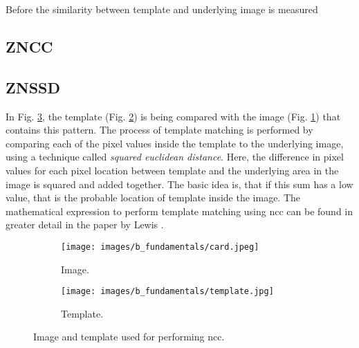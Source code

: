     Before the similarity between template and underlying image is measured

    \subsection*{}
    \subsection*{ZNCC}
    \subsection*{ZNSSD}
    

    \vspace{5mm}
    \noindent In Fig. \ref{fig:ncc_example}, the template (Fig. \ref{subfig:template.jpg}) is being compared with the image (Fig. \ref{subfig:card.jpg}) that contains this pattern. The process of template matching is performed by comparing each of the pixel values inside the template to the underlying image, using a technique called \emph{squared euclidean distance}. Here, the difference in pixel values for each pixel location between template and the underlying area in the image is squared and added together. The basic idea is, that if this sum has a low value, that is the probable location of template inside the image. The mathematical expression to perform template matching using \gls{ncc} can be found in greater detail in the paper by Lewis \cite{lewis}.

    \begin{figure}[h]
        \begin{subfigure}{0.5\textwidth}
            \centering
            \texttt{[image: images/b\_fundamentals/card.jpeg]}
            \caption{Image.}
            \label{subfig:card.jpg}
        \end{subfigure}
        \begin{subfigure}{0.5\textwidth}
            \centering
            \texttt{[image: images/b\_fundamentals/template.jpg]}
            \caption{Template.}
            \label{subfig:template.jpg}
        \end{subfigure}
        \caption{Image and template used for performing \gls{ncc}. \cite{img_card}}
        \label{fig:ncc_example}
    \end{figure}

    
